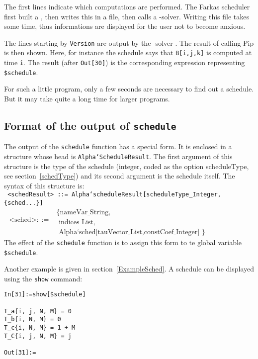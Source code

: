 The first lines indicate which computations are performed.  The Farkas
scheduler first built a \lp{}, then writes this \lp{} in a file,
then calls a \lp{}-solver. Writing this file takes some time, thus
informations are displayed for the user not to become anxious.

The lines starting by \texttt{Version} are output by the \lp{}-solver
\pip{}. The result of calling Pip is then shown. Here, for
instance the schedule says that \texttt{B[i,j,k]} is computed at time
\texttt{i}. The result (after \texttt{Out[30]}) is the corresponding
\mma{} expression representing \texttt{\$schedule}.

For such a little program, only a few seconds are necessary to find
out a schedule. But it may take quite a long time for larger {\aalpha}
programs.

\subsection{Format of the output of \texttt{schedule}}

The output of the \texttt{schedule} function has a special form. 
It is enclosed in a structure whose head is
\texttt{Alpha`ScheduleResult}. The first argument of this
structure is the type of 
the schedule (integer, coded as the option scheduleType, 
see section~\ref{schedType}) and its 
second argument is the schedule itself. 
The syntax of this structure is:\\
\texttt{
<schedResult> ::= Alpha`scheduleResult[scheduleType\_Integer,\{sched...\}]\\
$\begin{array}{l} \mbox{ <sched>} ::= \\ ~\\  ~ \end{array}\begin{array}{l} \mbox{\{ nameVar\_String,}\\
          \mbox{ indices\_List,}\\
           \mbox{ Alpha`sched[tauVector\_List,constCoef\_Integer] \}}
\end{array}$
}\\
The effect of the \texttt{schedule} function is to assign this form 
to te global variable \texttt{\$schedule}.

Another example is given in section~\ref{ExampleSched}. 
A schedule can be displayed using the \texttt{show} command:
\begin{verbatim}
In[31]:=show[$schedule]

T_a{i, j, N, M} = 0
T_b{i, N, M} = 0
T_c{i, N, M} = 1 + M
T_C{i, j, N, M} = j

Out[31]:=
\end{verbatim}

